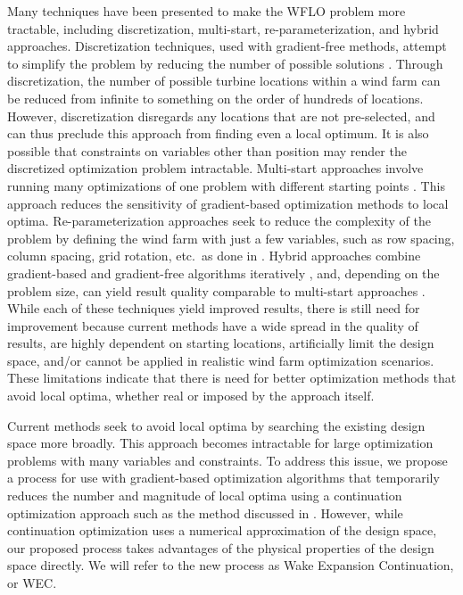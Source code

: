 \documentclass[a4paper]{jpconf}
\begin{document}
Many techniques have been presented to make the WFLO problem more tractable, including discretization, multi-start, re-parameterization, and hybrid approaches. Discretization techniques, used with gradient-free methods, attempt to simplify the problem by reducing the number of possible solutions \cite{mosetti1994, grady2005}. Through discretization, the number of possible turbine locations within a wind farm can be reduced from infinite to something on the order of hundreds of locations. However, discretization disregards any locations that are not pre-selected, and can thus preclude this approach from finding even a local optimum. It is also possible that constraints on variables other than position may render the discretized optimization problem intractable. Multi-start approaches involve running many optimizations of one problem with different starting points \cite{gonzalez2014}. This approach reduces the sensitivity of gradient-based optimization methods to local optima. Re-parameterization approaches seek to reduce the complexity of the problem by defining the wind farm with just a few variables, such as row spacing, column spacing, grid rotation, etc.~as done in \cite{stanley2020}. Hybrid approaches combine gradient-based and gradient-free algorithms iteratively \cite{rethore2014,graf2016, mittal2017}, and, depending on the problem size, can yield result quality comparable to multi-start approaches \cite{rethore2014}. While each of these techniques yield improved results, there is still need for improvement because current methods have a wide spread in the quality of results, are highly dependent on starting locations, artificially limit the design space, and/or cannot be applied in realistic wind farm optimization scenarios. These limitations indicate that there is need for better optimization methods that avoid local optima, whether real or imposed by the approach itself.

Current methods seek to avoid local optima by searching the existing design space more broadly. This approach becomes intractable for large optimization problems with many variables and constraints. To address this issue, we propose a process for use with gradient-based optimization algorithms that temporarily reduces the number and magnitude of local optima using a continuation optimization approach such as the method discussed in \cite{mobahi2015}. However, while continuation optimization uses a numerical approximation of the design space, our proposed process takes advantages of the physical properties of the design space directly. We will refer to the new process as Wake Expansion Continuation, or WEC.
\end{document}
